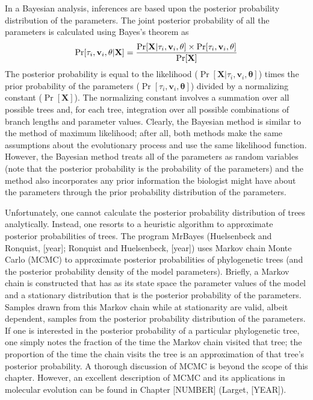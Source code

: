 \documentclass{svmult}
\begin{document}
In a Bayesian analysis, inferences are based upon the posterior probability distribution of the
parameters. The joint posterior probability of all the parameters  is calculated using Bayes's
theorem as
$$
\Pr[\tau_i, {\mathbf v}_i, {\mathbf \theta} | {\mathbf X}] = 
{\Pr[ {\mathbf X} |  \tau_i, {\mathbf v}_i, {\mathbf \theta} ] \times \Pr[\tau_i, {\mathbf v}_i, {\mathbf \theta}]
 \over 
\Pr[ {\mathbf X}] }
$$
The posterior probability is equal to the likelihood ($\Pr[ {\mathbf X} |  \tau_i, {\mathbf v}_i,
{\mathbf \theta} ]$) times the prior probability of the parameters ($\Pr[\tau_i, {\mathbf v}_i,
{\mathbf \theta}]$) divided by a normalizing constant ($\Pr[ {\mathbf X}]$). The normalizing
constant involves a summation over all possible trees and, for each tree, integration over all
possible combinations of branch lengths and parameter values. Clearly, the Bayesian method is
similar to the method of maximum likelihood; after all, both methods make the same assumptions
about the evolutionary process and use the same likelihood function. However, the Bayesian method
treats all of the parameters as random variables (note that the posterior probability is the
probability of the parameters) and the method also incorporates any prior information the biologist
might have about the parameters through the prior probability distribution of the parameters.  

Unfortunately, one cannot calculate the posterior probability distribution of trees analytically.
Instead, one resorts to a heuristic algorithm to approximate posterior probabilities of trees. The
program MrBayes (Huelsenbeck and Ronquist, [year]; Ronquist and Huelsenbeck, [year]) uses Markov
chain Monte Carlo (MCMC) to approximate posterior probabilities of phylogenetic trees (and the
posterior probability density of the model parameters). Briefly, a Markov chain is constructed that
has as its state space the parameter values of the model and a stationary distribution that is the
posterior probability of the parameters. Samples drawn from this Markov chain while at stationarity
are valid, albeit dependent, samples from the posterior probability distribution of the parameters.
If one is interested in the posterior probability of a particular phylogenetic tree, one simply
notes the fraction of the time the Markov chain visited that tree; the proportion of the time the
chain visits the tree is an approximation of that tree's posterior probability. A thorough
discussion of MCMC is beyond the scope of this chapter. However, an excellent description of MCMC
and its applications in molecular evolution can be found in Chapter [NUMBER] (Larget, [YEAR]).
\end{document}
